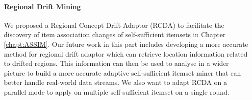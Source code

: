 \paragraph{Regional Drift Mining}

We proposed a Regional Concept Drift Adaptor (RCDA) to facilitate the discovery of item association changes of self-sufficient itemsets in Chapter \ref{chapt:ASSIM}. Our future work in this part includes developing a more accurate method for regional drift adaptor which can retrieve location information related to drifted regions. This information can then be used to analyse in a wider picture to build a more accurate adaptive self-sufficient itemset miner that can better handle real-world data streams. We also want to adapt RCDA on a parallel mode to apply on multiple self-sufficient itemset on a single round.

